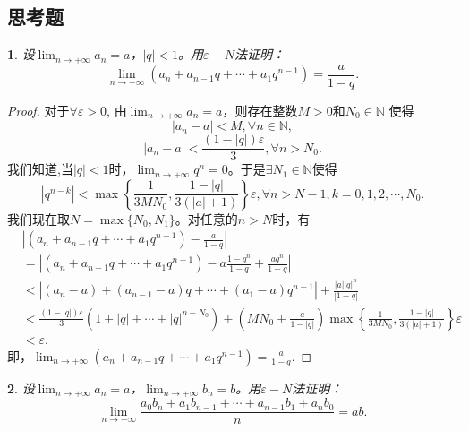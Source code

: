 \documentclass[utf8]{book}
\newtheorem{example}{}[section]             %
\begin{document}
\subsection{思考题}
\begin{example}
设$\displaystyle \lim_{n\to +\infty}a_n = a$，$\left |q \right | < 1$。用$\varepsilon-N$法证明：
$$\displaystyle \lim_{n\to +\infty}(a_n + a_{n-1}q + \cdots + a_1q^{n-1}) = \frac{a}{1-q}.$$
\end{example}
\begin{proof}

对于$\forall \varepsilon > 0$, 由$\displaystyle \lim_{n\to +\infty}a_n = a$，则存在整数$M > 0$和$N_0 \in \mathbb{N}$ 使得
$$\left | a_n - a \right | < M, \forall n\in\mathbb{N},$$
$$\left | a_n - a \right | < \frac{(1-|q|)\varepsilon}{3}, \forall n > N_0.$$
我们知道,当$\left| q\right| < 1$时，$\displaystyle \lim_{n\to +\infty}q^n = 0$。于是$\exists N_1 \in \mathbb {N}$使得
$$\left|q^{n-k}\right| < \max\left \{\frac{1}{3MN_0}, \frac{1-|q|}{3(|a|+1)}\right\}\varepsilon, \forall n > N-1, k=0, 1, 2, \cdots, N_0.$$
我们现在取$N = \max\{N_0, N_1\}$。对任意的$n > N$时，有
\begin{equation*}
\begin{split}
&\left | (a_n + a_{n-1}q + \cdots + a_1q^{n-1}) - \frac{a}{1-q} \right | \\
&= \left | (a_n + a_{n-1}q + \cdots + a_1q^{n-1}) - a\frac{1-q^n}{1-q} + \frac{aq^n}{1-q}\right|\\
&< \left | (a_n - a) + (a_{n-1} - a)q + \cdots + (a_1- a)q^{n-1} \right | + \frac{\left|a\right|\left|q\right|^n}{\left|1-q\right|} \\
&<\frac{(1-|q|)\varepsilon}{3}(1 + |q| + \cdots + |q|^{n-N_0}) + \left(MN_0+\frac{a}{1-|q|}\right)\max\left \{\frac{1}{3MN_0}, \frac{1-|q|}{3(|a|+1)}\right\}
\varepsilon\\&< \varepsilon.
	\end{split}
\end{equation*}
即，$\displaystyle \lim_{n\to +\infty}(a_n + a_{n-1}q + \cdots + a_1q^{n-1}) = \frac{a}{1-q}.$ 

\end{proof}
\begin{example}
设$\displaystyle \lim_{n\to +\infty}a_n = a$，$\displaystyle \lim_{n\to +\infty}b_n = b$。用$\varepsilon-N$法证明：
$$\displaystyle \lim_{n\to +\infty}\frac{a_0b_n+a_1b_{n-1}+\cdots+a_{n-1}b_1+a_nb_0}{n}= ab.$$
\end{example}
\end{document}
